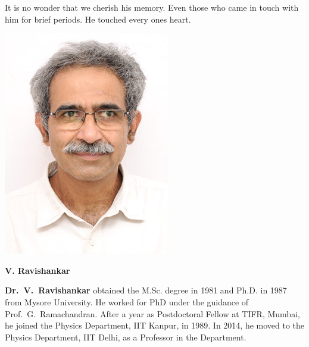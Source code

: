 It is no wonder that we cherish his memory. Even those who came in touch with him for brief periods. He touched every ones heart.






\centerline{\includegraphics[scale=.3]{figures/authors/V_Ravishankar.jpg}}
\smallskip

\centerline{\large\sf\bf V. Ravishankar}
\bigskip

\noindent
{\bf Dr.~V.~Ravishankar} obtained the M.Sc. degree in 1981 and Ph.D. in 1987 from Mysore University. He worked for PhD under the guidance of Prof.\ G.\ Ramachandran. After a year as Postdoctoral Fellow at TIFR, Mumbai, he joined the Physics Department, IIT Kanpur, in 1989. In 2014, he moved to the Physics Department, IIT Delhi, as a Professor in the Department.
